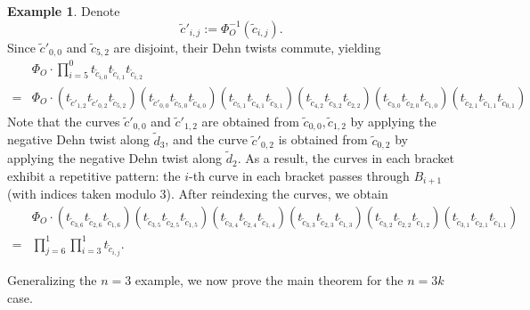 \documentclass[10pt,a4paper,reqno]{amsart}
\theoremstyle{definition}
\newtheorem{exam}[thm]{Example}
\numberwithin{equation}{section}
\numberwithin{figure}{section}
\begin{document}
\begin{exam}
Denote \[\tilde{c}'_{i,j}:= \Phi^{-1}_O (\tilde{c}_{i,j}).\]
Since $\tilde{c}'_{0,0}$ and $\tilde{c}_{5,2}$ are disjoint, their Dehn twists commute, yielding
\begin{align*}
&\Phi_O \cdot \prod_{i=5}^0 t_{\tilde{c}_{i,0}}t_{\tilde{c}_{i,1}}t_{\tilde{c}_{i,2}} \\
=& \Phi_O\cdot 
(t_{\tilde{c}'_{1,2}} t_{\tilde{c}'_{0,2}}t_{\tilde{c}_{5,2}}) (t_{\tilde{c}'_{0,0}} t_{\tilde{c}_{5,0}}t_{\tilde{c}_{4,0}}) ( t_{\tilde{c}_{5,1}}t_{\tilde{c}_{4,1}}t_{\tilde{c}_{3,1}})
( t_{\tilde{c}_{4,2}}t_{\tilde{c}_{3,2}}t_{\tilde{c}_{2,2}})( t_{\tilde{c}_{3,0}}t_{\tilde{c}_{2,0}}t_{\tilde{c}_{1,0}})
( t_{\tilde{c}_{2,1}}t_{\tilde{c}_{1,1}}t_{\tilde{c}_{0,1}})
\end{align*}
Note that the curves $\tilde{c}'_{0,0}$ and $\tilde{c}'_{1,2}$ are obtained from $\tilde{c}_{0,0}, \tilde{c}_{1,2}$ by applying the negative Dehn twist along $\tilde{d}_3$, 
and the curve $\tilde{c}'_{0,2}$ is obtained from $\tilde{c}_{0,2}$ by applying the negative Dehn twist along $\tilde{d}_2$.
As a result, the curves in each bracket exhibit a repetitive pattern:
the $i$-th curve in each bracket passes through $B_{i+1}$ (with indices taken modulo $3$).
After reindexing the curves, we obtain 
\begin{align*}
&
\Phi_O\cdot (t_{\tilde{c}_{3,6}}t_{\tilde{c}_{2,6}}t_{\tilde{c}_{1,6}})(t_{\tilde{c}_{3,5}}t_{\tilde{c}_{2,5}}t_{\tilde{c}_{1,5}})
(t_{\tilde{c}_{3,4}}t_{\tilde{c}_{2,4}}t_{\tilde{c}_{1,4}}) (t_{\tilde{c}_{3,3}}t_{\tilde{c}_{2,3}}t_{\tilde{c}_{1,3}})
(t_{\tilde{c}_{3,2}}t_{\tilde{c}_{2,2}}t_{\tilde{c}_{1,2}}) (t_{\tilde{c}_{3,1}}t_{\tilde{c}_{2,1}}t_{\tilde{c}_{1,1}}) \\
=&\prod_{j=6}^1 \prod_{i=3}^1 t_{\tilde{c}_{i,j}}.
\end{align*}
\end{exam}

Generalizing the $n=3$ example, we now prove the main theorem for the $n=3k$ case.
\end{document}
